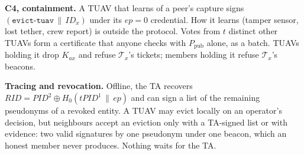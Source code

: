 \documentclass[conference]{IEEEtran}
\newcommand{\Ppub}{P_{\mathrm{pub}}}
\newcommand{\PID}{\mathit{PID}}
\newcommand{\RID}{\mathit{RID}}
\newcommand{\ep}{\mathit{ep}}
\newcommand{\cat}{\,\|\,}
\begin{document}
\textbf{C4, containment.} A TUAV that learns of a peer's capture signs $(\texttt{evict-tuav}\cat ID_x)$ under its $\ep=0$ credential. How it learns (tamper sensor, lost
tether, crew report) is outside the protocol. Votes from $t$ distinct other TUAVs form a certificate that anyone checks with $\Ppub$ alone, as a batch. TUAVs holding it
drop $K_{ax}$ and refuse $\mathcal T_x$'s tickets; members holding it refuse $\mathcal T_x$'s beacons.

\textbf{Tracing and revocation.} Offline, the TA recovers $\RID=\PID^2\oplus H_0(t\PID^1\cat\ep)$ and can sign a list of the remaining pseudonyms of a revoked entity.
A TUAV may evict locally on an operator's decision, but neighbours accept an eviction only with a TA-signed list or with evidence: two valid signatures by one
pseudonym under one beacon, which an honest member never produces. Nothing waits for the TA.

\end{document}
